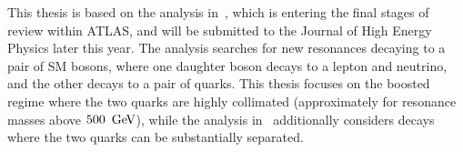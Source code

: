 This thesis is based on the analysis in~, which is entering the final stages of review within ATLAS, and will be submitted to the Journal of High Energy Physics later this year. The analysis searches for new resonances decaying to a pair of SM bosons, where one daughter boson decays to a lepton and neutrino, and the other decays to a pair of quarks. This thesis focuses on the boosted regime where the two quarks are highly collimated (approximately for resonance masses above $500\,\GeV$), while the analysis in~ additionally considers decays where the two quarks can be substantially separated.









